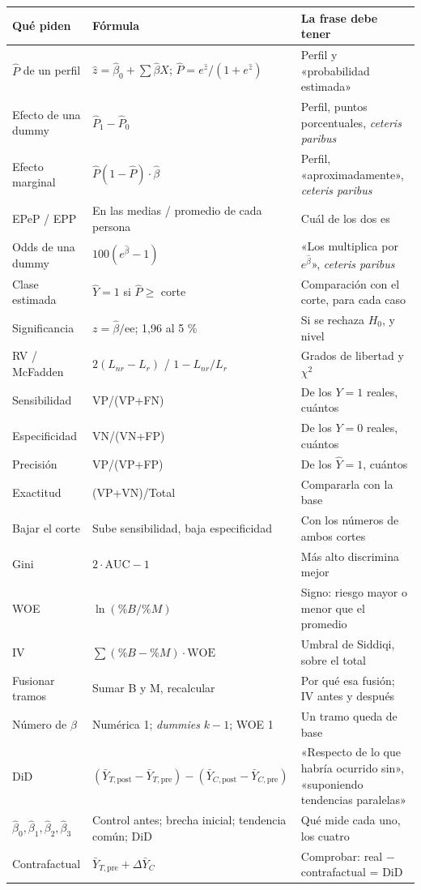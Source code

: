 \documentclass[11pt,letterpaper]{article}
\newcommand{\Ph}{\hat{P}}
\newcommand{\zh}{\hat{z}}
\begin{document}
\begin{center}
\renewcommand{\arraystretch}{1.25}
\begin{tabular}{p{4.3cm}p{6.1cm}p{4.5cm}}
\toprule
\textbf{Qué piden} & \textbf{Fórmula} & \textbf{La frase debe tener} \\
\midrule
$\Ph$ de un perfil & $\zh=\hat\beta_0+\sum\hat\beta X$; $\Ph=e^{\zh}/(1+e^{\zh})$ & Perfil y «probabilidad estimada» \\
Efecto de una dummy & $\Ph_1-\Ph_0$ & Perfil, puntos porcentuales, \emph{ceteris paribus} \\
Efecto marginal & $\Ph(1-\Ph)\cdot\hat\beta$ & Perfil, «aproximadamente», \emph{ceteris paribus} \\
EPeP / EPP & En las medias / promedio de cada persona & Cuál de los dos es \\
Odds de una dummy & $100(e^{\hat\beta}-1)$ & «Los multiplica por $e^{\hat\beta}$», \emph{ceteris paribus} \\
Clase estimada & $\hat Y=1$ si $\Ph\ge$ corte & Comparación con el corte, para cada caso \\
Significancia & $z=\hat\beta/\text{ee}$; 1,96 al 5 \% & Si se rechaza $H_0$, y nivel \\
RV / McFadden & $2(L_{nr}-L_r)$ / $1-L_{nr}/L_r$ & Grados de libertad y $\chi^2$ \\
\midrule
Sensibilidad & VP/(VP+FN) & De los $Y=1$ reales, cuántos \\
Especificidad & VN/(VN+FP) & De los $Y=0$ reales, cuántos \\
Precisión & VP/(VP+FP) & De los $\hat Y=1$, cuántos \\
Exactitud & (VP+VN)/Total & Compararla con la base \\
Bajar el corte & Sube sensibilidad, baja especificidad & Con los números de ambos cortes \\
Gini & $2\cdot\text{AUC}-1$ & Más alto discrimina mejor \\
\midrule
WOE & $\ln(\%B/\%M)$ & Signo: riesgo mayor o menor que el promedio \\
IV & $\sum(\%B-\%M)\cdot\text{WOE}$ & Umbral de Siddiqi, sobre el total \\
Fusionar tramos & Sumar B y M, recalcular & Por qué esa fusión; IV antes y después \\
Número de $\beta$ & Numérica 1; \emph{dummies} $k-1$; WOE 1 & Un tramo queda de base \\
\midrule
DiD & $(\bar Y_{T,\text{post}}-\bar Y_{T,\text{pre}})-(\bar Y_{C,\text{post}}-\bar Y_{C,\text{pre}})$ & «Respecto de lo que habría ocurrido sin», «suponiendo tendencias paralelas» \\
$\hat\beta_0,\hat\beta_1,\hat\beta_2,\hat\beta_3$ & Control antes; brecha inicial; tendencia común; DiD & Qué mide cada uno, los cuatro \\
Contrafactual & $\bar Y_{T,\text{pre}}+\Delta\bar Y_{C}$ & Comprobar: real $-$ contrafactual = DiD \\
\bottomrule
\end{tabular}
\end{center}
\end{document}
